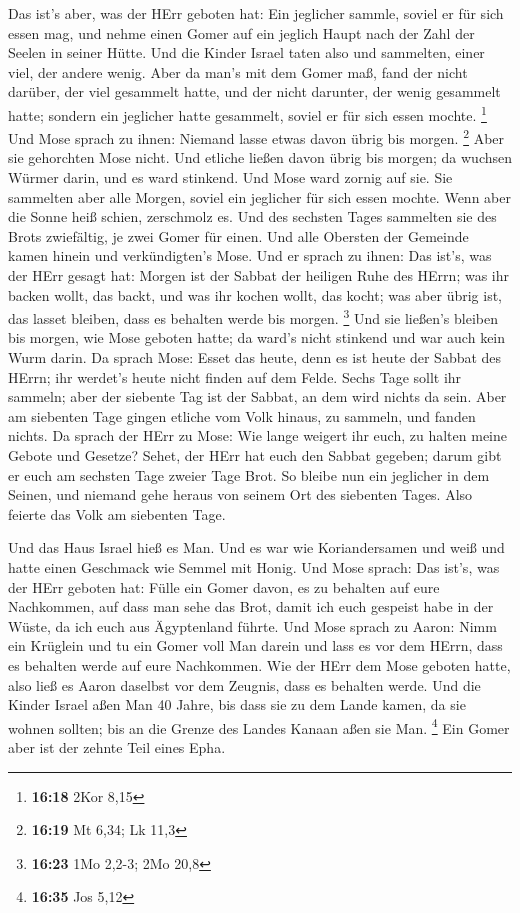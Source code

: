  Das ist's aber, was der HErr geboten hat: Ein jeglicher
sammle, soviel er für sich essen mag, und nehme einen Gomer auf ein
jeglich Haupt nach der Zahl der Seelen in seiner Hütte. 
Und die Kinder Israel taten also und sammelten, einer viel, der andere
wenig.  Aber da man's mit dem Gomer maß, fand der nicht
darüber, der viel gesammelt hatte, und der nicht darunter, der wenig
gesammelt hatte; sondern ein jeglicher hatte gesammelt, soviel er für
sich essen mochte. \footnote{\textbf{16:18} 2Kor 8,15} 
Und Mose sprach zu ihnen: Niemand lasse etwas davon übrig bis morgen.
\footnote{\textbf{16:19} Mt 6,34; Lk 11,3}  Aber sie
gehorchten Mose nicht. Und etliche ließen davon übrig bis morgen; da
wuchsen Würmer darin, und es ward stinkend. Und Mose ward zornig auf
sie.  Sie sammelten aber alle Morgen, soviel ein
jeglicher für sich essen mochte. Wenn aber die Sonne heiß schien,
zerschmolz es.  Und des sechsten Tages sammelten sie des
Brots zwiefältig, je zwei Gomer für einen. Und alle Obersten der
Gemeinde kamen hinein und verkündigten's Mose.  Und er
sprach zu ihnen: Das ist's, was der HErr gesagt hat: Morgen ist der
Sabbat der heiligen Ruhe des HErrn; was ihr backen wollt, das backt, und
was ihr kochen wollt, das kocht; was aber übrig ist, das lasset bleiben,
dass es behalten werde bis morgen. \footnote{\textbf{16:23} 1Mo 2,2-3;
  2Mo 20,8}  Und sie ließen's bleiben bis morgen, wie
Mose geboten hatte; da ward's nicht stinkend und war auch kein Wurm
darin.  Da sprach Mose: Esset das heute, denn es ist
heute der Sabbat des HErrn; ihr werdet's heute nicht finden auf dem
Felde.  Sechs Tage sollt ihr sammeln; aber der siebente
Tag ist der Sabbat, an dem wird nichts da sein.  Aber am
siebenten Tage gingen etliche vom Volk hinaus, zu sammeln, und fanden
nichts.  Da sprach der HErr zu Mose: Wie lange weigert
ihr euch, zu halten meine Gebote und Gesetze?  Sehet, der
HErr hat euch den Sabbat gegeben; darum gibt er euch am sechsten Tage
zweier Tage Brot. So bleibe nun ein jeglicher in dem Seinen, und niemand
gehe heraus von seinem Ort des siebenten Tages.  Also
feierte das Volk am siebenten Tage.

 Und das Haus Israel hieß es Man. Und es war wie
Koriandersamen und weiß und hatte einen Geschmack wie Semmel mit Honig.
 Und Mose sprach: Das ist's, was der HErr geboten hat:
Fülle ein Gomer davon, es zu behalten auf eure Nachkommen, auf dass man
sehe das Brot, damit ich euch gespeist habe in der Wüste, da ich euch
aus Ägyptenland führte.  Und Mose sprach zu Aaron: Nimm
ein Krüglein und tu ein Gomer voll Man darein und lass es vor dem HErrn,
dass es behalten werde auf eure Nachkommen.  Wie der HErr
dem Mose geboten hatte, also ließ es Aaron daselbst vor dem Zeugnis,
dass es behalten werde.  Und die Kinder Israel aßen Man
40 Jahre, bis dass sie zu dem Lande kamen, da sie wohnen sollten; bis an
die Grenze des Landes Kanaan aßen sie Man. \footnote{\textbf{16:35} Jos
  5,12}  Ein Gomer aber ist der zehnte Teil eines Epha.

